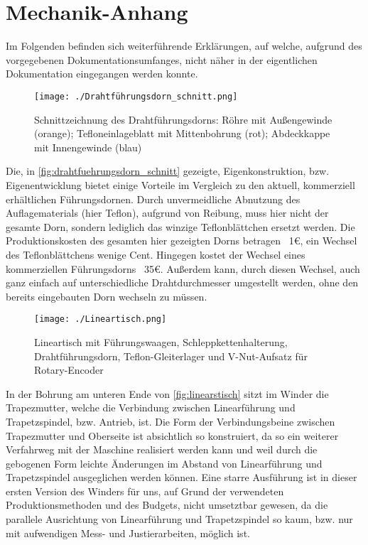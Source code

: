 \appendix

\section{Mechanik-Anhang}
\label{appx:mechanik}

Im Folgenden befinden sich weiterführende Erklärungen, auf welche, aufgrund des vorgegebenen Dokumentationsumfanges, nicht näher in der eigentlichen Dokumentation eingegangen werden konnte. 

\begin{figure}[H]
    \centering
    \texttt{[image: ./Drahtführungsdorn\_schnitt.png]}
    \caption{Schnittzeichnung des Drahtführungsdorns: Röhre mit Außengewinde (orange); Tefloneinlageblatt mit Mittenbohrung (rot); Abdeckkappe mit Innengewinde (blau)}
    \label{fig:drahtfuehrungsdorn_schnitt}
\end{figure}

Die, in \autoref{fig:drahtfuehrungsdorn_schnitt} gezeigte, Eigenkonstruktion, bzw. Eigenentwicklung bietet einige Vorteile im Vergleich zu den aktuell, kommerziell erhältlichen Führungsdornen. Durch unvermeidliche Abnutzung des Auflagematerials (hier Teflon), aufgrund von Reibung, muss hier nicht der gesamte Dorn, sondern lediglich das winzige Teflonblättchen ersetzt werden. Die Produktionskosten des gesamten hier gezeigten Dorns betragen ~1€, ein Wechsel des Teflonblättchens wenige Cent. Hingegen kostet der Wechsel eines kommerziellen Führungsdorns ~35€. Außerdem kann, durch diesen Wechsel, auch ganz einfach auf unterschiedliche Drahtdurchmesser umgestellt werden, ohne den bereits eingebauten Dorn wechseln zu müssen.


\begin{figure}[H]
    \centering
    \texttt{[image: ./Lineartisch.png]}
    \caption{Lineartisch mit Führungswaagen, Schleppkettenhalterung, Drahtführungsdorn, Teflon-Gleiterlager und V-Nut-Aufsatz für Rotary-Encoder}
    \label{fig:linearstisch}
\end{figure}
In der Bohrung am unteren Ende von \autoref{fig:linearstisch} sitzt im Winder die Trapezmutter, welche die Verbindung zwischen Linearführung und Trapetzspindel, bzw. Antrieb, ist. Die Form der Verbindungsbeine zwischen Trapezmutter und Oberseite ist absichtlich so konstruiert, da so ein weiterer Verfahrweg mit der Maschine realisiert werden kann und weil durch die gebogenen Form leichte Änderungen im Abstand von Linearführung und Trapetzspindel ausgeglichen werden können. Eine starre Ausführung ist in dieser ersten Version des Winders für uns, auf Grund der verwendeten Produktionsmethoden und des Budgets, nicht umsetztbar gewesen, da die parallele Ausrichtung von Linearführung und Trapetzspindel so kaum, bzw. nur mit aufwendigen Mess- und Justierarbeiten, möglich ist.

